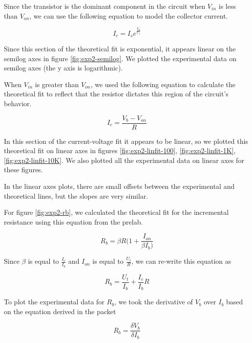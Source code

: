 \documentclass{article}
\begin{document}
Since the transistor is the dominant component in the circuit when $V_{in}$ is less than $V_{on}$, we can use the following equation to model the collector current.

\begin{centering}
$$I_c = I_s  e^{\frac{V_{b}}{U_t}}$$ 
\end{centering}

Since this section of the theoretical fit is exponential, it appears linear on the semilog axes in figure \ref{fig:exp2-semilog}. We plotted the experimental data on semilog axes (the y axis is logarithmic).

When $V_{in}$ is greater than $V_{on}$, we used the following equation to calculate the theoretical fit to reflect that the  resistor dictates this region of the circuit's behavior.

\begin{centering}
$$I_c = \frac{V_b - V_{on}}{R}$$
\end{centering}

In this section of the current-voltage fit it appears to be linear, so we plotted this theoretical fit on linear axes in figures \ref{fig:exp2-linfit-100}, \ref{fig:exp2-linfit-1K}, \ref{fig:exp2-linfit-10K}. We also plotted all the experimental data on linear axes for these figures. 

In the linear axes plots, there are small offsets between the experimental and theoretical lines, but the slopes are very similar. 

For figure \ref{fig:exp2-rb}, we calculated the theoretical fit for the incremental resistance using this equation from the prelab.

\begin{centering}
$$R_b = \beta R (1 + \frac{I_{on}}{\beta I_b)}$$
\end{centering}

Since $\beta$ is equal to $\frac{I_c}{I_b}$ and $I_{on}$ is equal to $\frac{U_t}{R}$, we can re-write this equation as

\begin{centering}
$$R_b = \frac{U_t}{I_b} + \frac{I_c}{I_b}R$$
\end{centering}

To plot the experimental data for $R_b$, we took the derivative of $V_b$ over $I_b$ based on the equation derived in the packet

\begin{centering}
$$R_b = \frac{\delta V_b}{\delta I_b}$$
\end{centering}
\end{document}
